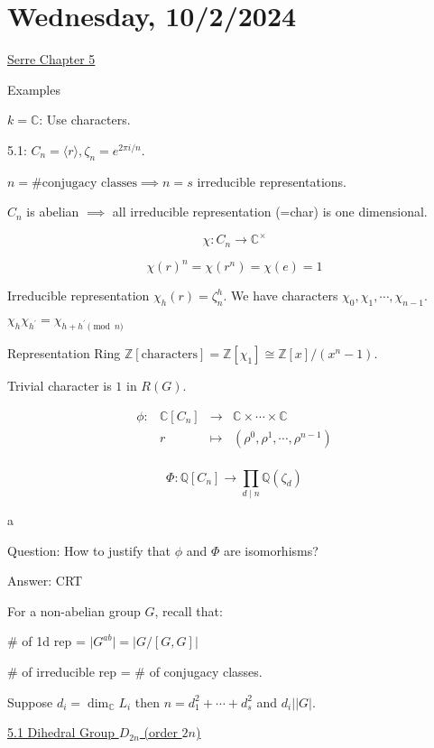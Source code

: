 \documentclass{article}
\theoremstyle{definition}
\begin{document}
\section*{Wednesday, 10/2/2024}

\underline{Serre Chapter 5}

Examples

\(k = \mathbb{C}\): Use characters.

5.1: \(C_n = \langle r \rangle, \zeta_n = e^{2\pi i / n}\).

\(n = \#\text{conjugacy classes}\implies n=s\) irreducible representations.

\(C_n\) is abelian \(\implies\) all irreducible representation (=char) is one dimensional.

\[
    \chi: C_n \to \mathbb{C}^\times
\]

\[
    \chi(r)^n = \chi(r^n)=\chi(e)=1
\]

Irreducible representation \(\chi_h(r)=\zeta_n^h\). We have characters \(\chi_0, \chi_1, \cdots, \chi_{n-1}\).

\(\chi_h \chi_{h^{\prime}} = \chi_{h + h^{\prime} \pmod n}\) 

Representation Ring \(\mathbb{Z}[\text{characters}] = \mathbb{Z} [\chi_1] \cong \mathbb{Z}[x] / (x^n - 1)\).

Trivial character is \(1\) in \(R(G)\).

\[
    \begin{array}{cccc}
        \phi: & \mathbb{C}[C_n] & \to &  \mathbb{C} \times \cdots \times \mathbb{C}  \\
         & r & \mapsto &  (\rho^0, \rho^1, \cdots , \rho^{n-1}) \\
    \end{array}
\]

\[
    \Phi: \mathbb{Q}[C_n] \to \prod_{d\mid n} \mathbb{Q}(\zeta_d)
\]

a

Question: How to justify that \(\phi\) and \(\Phi\) are isomorhisms?

Answer: CRT 

For a non-abelian group \(G\), recall that:

\(\#\) of 1d rep = \(\vert G^{ab} \vert = \vert G / [G,G] \vert \) 

\(\#\) of irreducible rep = \(\#\) of conjugacy classes.

Suppose \(d_i = \dim_\mathbb{C} L_i\) then \(n = d_1^2 + \cdots + d_s^2\) and \(d_i\mid \vert G \vert \).

\underline{5.1 Dihedral Group \(D_{2n}\) (order \(2n\))}
\end{document}
